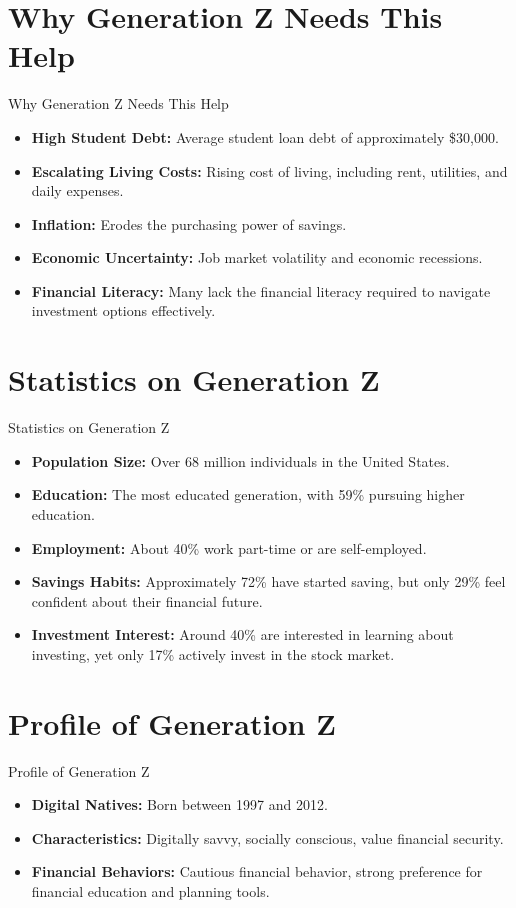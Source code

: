 \documentclass{beamer}
\begin{document}
\section{Why Generation Z Needs This Help}
\begin{frame}{Why Generation Z Needs This Help}
    \begin{itemize}
        \item \textbf{High Student Debt:} Average student loan debt of approximately \$30,000.
        \item \textbf{Escalating Living Costs:} Rising cost of living, including rent, utilities, and daily expenses.
        \item \textbf{Inflation:} Erodes the purchasing power of savings.
        \item \textbf{Economic Uncertainty:} Job market volatility and economic recessions.
        \item \textbf{Financial Literacy:} Many lack the financial literacy required to navigate investment options effectively.
    \end{itemize}
\end{frame}

\section{Statistics on Generation Z}
\begin{frame}{Statistics on Generation Z}
    \begin{itemize}
        \item \textbf{Population Size:} Over 68 million individuals in the United States.
        \item \textbf{Education:} The most educated generation, with 59\% pursuing higher education.
        \item \textbf{Employment:} About 40\% work part-time or are self-employed.
        \item \textbf{Savings Habits:} Approximately 72\% have started saving, but only 29\% feel confident about their financial future.
        \item \textbf{Investment Interest:} Around 40\% are interested in learning about investing, yet only 17\% actively invest in the stock market.
    \end{itemize}
\end{frame}

\section{Profile of Generation Z}
\begin{frame}{Profile of Generation Z}
    \begin{itemize}
        \item \textbf{Digital Natives:} Born between 1997 and 2012.
        \item \textbf{Characteristics:} Digitally savvy, socially conscious, value financial security.
        \item \textbf{Financial Behaviors:} Cautious financial behavior, strong preference for financial education and planning tools.
    \end{itemize}
\end{frame}
\end{document}
